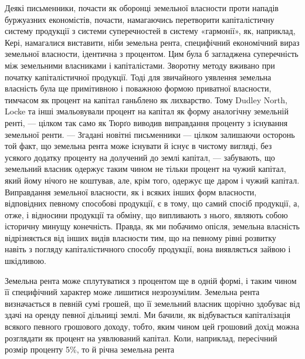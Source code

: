 Деякі письменники, почасти як оборонці земельної власности проти нападів
буржуазних економістів, почасти, намагаючись перетворити капіталістичну систему продукції з системи
суперечностей в систему «гармонії», як, наприклад,
Кері, намагалися виставити, ніби земельна рента, специфічний економічний
вираз земельної власности, ідентична з процентом. Цим була б загладжена суперечність між земельними
власниками і капіталістами. Зворотну методу вживано при початку капіталістичної продукції. Тоді для
звичайного уявлення земельна власність була ще примітивною і поважною формою приватної власности,
тимчасом
як процент на капітал ганьблено як лихварство. Тому Dudley North, Locke
та інші змальовували процент на капітал як форму аналогічну земельній
ренті, — цілком так само як Тюрґо виводив виправдання проценту з існування
земельної ренти. — Згадані новітні письменники — цілком залишаючи осторонь той факт, що земельна
рента може існувати й існує в чистому вигляді,
без усякого додатку проценту на долучений до землі капітал, — забувають, що
земельний власник одержує таким чином не тільки процент на чужий капітал,
який йому нічого не коштував, але, крім того, одержує ще даром і чужий
капітал. Виправдання земельної власности, як і всяких інших форм власности,
відповідних певному способові продукції, є в тому, що самий спосіб продукції,
а, отже, і відносини продукції та обміну, що випливають з нього, являють собою
історичну минущу конечність. Правда, як ми побачимо опісля, земельна власність
відрізняється від інших видів власности тим, що на певному рівні розвитку
навіть з погляду капіталістичного способу продукції, вона виявляється зайвою
і шкідливою.

Земельна рента може сплутуватися з процентом ще в одній формі, і таким чином її специфічний характер
може лишитися незрозумілим. Земельна
рента визначається в певній сумі грошей, що її земельний власник щорічно здобуває від здачі на
оренду певної дільниці землі. Ми бачили, як відбувається
капіталізація всякого певного грошового доходу, тобто, яким чином
цей грошовий дохід можна розглядати як процент на уявлюваний капітал.
Коли, наприклад, пересічний розмір проценту 5\%, то й річна земельна рента
